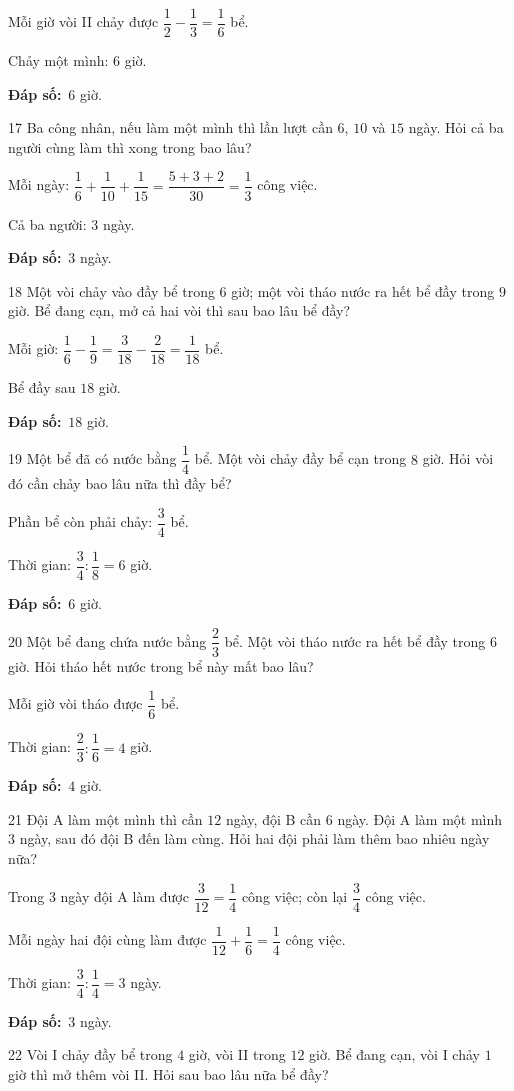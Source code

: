 \documentclass[11pt]{article}
\newif\ifsol \solfalse
\providecommand{\AnsWord}{Đáp số}
\newcommand{\dapso}[1]{\par\textbf{\AnsWord:}\ #1}
\newcommand{\probsol}[1]{%
  \begin{lrbox}{\solmeasure}\begin{minipage}{\dimexpr\linewidth-24pt\relax}#1\end{minipage}\end{lrbox}%
  \ifsol
    \begin{solbox}#1\end{solbox}%
  \else
    \setlength{\solht}{\dimexpr\ht\solmeasure+\dp\solmeasure+0.85cm\relax}%
    \ifdim\solht<1.35cm\setlength{\solht}{1.35cm}\fi
    \begin{tcolorbox}[colback=white,colframe=Line,boxrule=0.8pt,arc=5pt,
      left=8pt,right=8pt,top=4pt,bottom=4pt,height=\solht]{\footnotesize\color{Slate}\itshape\WorkWord}\end{tcolorbox}%
  \fi}
\newcommand{\gap}{\vspace{0.3cm}}
\def\WorkWord{Bài làm:}
\def\AnsWord{Đáp số}
\begin{document}
\probsol{
Mỗi giờ vòi II chảy được $\dfrac12-\dfrac13=\dfrac16$ bể.\par Chảy một mình: $6$ giờ.
\dapso{$6$ giờ.}}
\gap
\begin{probbox}{17}{\relax}
Ba công nhân, nếu làm một mình thì lần lượt cần $6$, $10$ và $15$ ngày. Hỏi cả ba người cùng làm thì xong trong bao lâu?
\end{probbox}
\probsol{
Mỗi ngày: $\dfrac16+\dfrac1{10}+\dfrac1{15}=\dfrac{5+3+2}{30}=\dfrac13$ công việc.\par Cả ba người: $3$ ngày.
\dapso{$3$ ngày.}}
\gap
\begin{probbox}{18}{\relax}
Một vòi chảy vào đầy bể trong $6$ giờ; một vòi tháo nước ra hết bể đầy trong $9$ giờ. Bể đang cạn, mở cả hai vòi thì sau bao lâu bể đầy?
\end{probbox}
\probsol{
Mỗi giờ: $\dfrac16-\dfrac19=\dfrac3{18}-\dfrac2{18}=\dfrac1{18}$ bể.\par Bể đầy sau $18$ giờ.
\dapso{$18$ giờ.}}
\gap
\begin{probbox}{19}{\relax}
Một bể đã có nước bằng $\dfrac14$ bể. Một vòi chảy đầy bể cạn trong $8$ giờ. Hỏi vòi đó cần chảy bao lâu nữa thì đầy bể?
\end{probbox}
\probsol{
Phần bể còn phải chảy: $\dfrac34$ bể.\par Thời gian: $\dfrac34:\dfrac18=6$ giờ.
\dapso{$6$ giờ.}}
\gap
\begin{probbox}{20}{\relax}
Một bể đang chứa nước bằng $\dfrac23$ bể. Một vòi tháo nước ra hết bể đầy trong $6$ giờ. Hỏi tháo hết nước trong bể này mất bao lâu?
\end{probbox}
\probsol{
Mỗi giờ vòi tháo được $\dfrac16$ bể.\par Thời gian: $\dfrac23:\dfrac16=4$ giờ.
\dapso{$4$ giờ.}}
\gap
\begin{probbox}{21}{\relax}
Đội A làm một mình thì cần $12$ ngày, đội B cần $6$ ngày. Đội A làm một mình $3$ ngày, sau đó đội B đến làm cùng. Hỏi hai đội phải làm thêm bao nhiêu ngày nữa?
\end{probbox}
\probsol{
Trong $3$ ngày đội A làm được $\dfrac3{12}=\dfrac14$ công việc; còn lại $\dfrac34$ công việc.\par Mỗi ngày hai đội cùng làm được $\dfrac1{12}+\dfrac16=\dfrac14$ công việc.\par Thời gian: $\dfrac34:\dfrac14=3$ ngày.
\dapso{$3$ ngày.}}
\gap
\begin{probbox}{22}{\relax}
Vòi I chảy đầy bể trong $4$ giờ, vòi II trong $12$ giờ. Bể đang cạn, vòi I chảy $1$ giờ thì mở thêm vòi II. Hỏi sau bao lâu nữa bể đầy?
\end{probbox}
\end{document}
